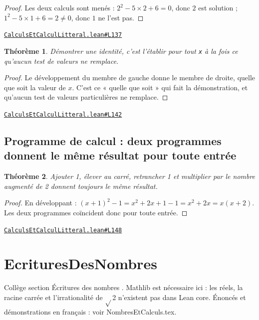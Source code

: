 \documentclass[11pt,a4paper]{article}
\theoremstyle{definition}
\theoremstyle{plain}
\newtheorem{theoreme}{Théorème}
\newcommand{\source}[2]{\par\smallskip\noindent\hfill{\footnotesize\href{#1}{\texttt{#2}}}\par\smallskip}
\begin{document}
\begin{proof}
Les deux calculs sont menés : $2^2 - 5 \times 2 + 6 = 0$, donc $2$ est solution ;
$1^2 - 5 \times 1 + 6 = 2 \ne 0$, donc $1$ ne l'est pas.
\end{proof}
\source{https://github.com/Commutator-IO/learn-lean/blob/main/cours/01-college/01-nombres-et-calculs/CalculsEtCalculLitteral.lean\#L137}{CalculsEtCalculLitteral.lean\#L137}

\begin{theoreme}
Démontrer une identité, c'est l'établir pour tout \texttt{x} à la fois \textemdash{} ce qu'aucun test de
valeurs ne remplace.
\end{theoreme}

\begin{proof}
Le développement du membre de gauche donne le membre de droite, quelle que soit la
valeur de $x$. C'est ce « quelle que soit » qui fait la démonstration, et qu'aucun test de
valeurs particulières ne remplace.
\end{proof}
\source{https://github.com/Commutator-IO/learn-lean/blob/main/cours/01-college/01-nombres-et-calculs/CalculsEtCalculLitteral.lean\#L142}{CalculsEtCalculLitteral.lean\#L142}

\subsection{Programme de calcul : deux programmes donnent le même résultat pour toute entrée}

\begin{theoreme}
\og{} Ajouter 1, élever au carré, retrancher 1 \fg{} et \og{} multiplier par le nombre augmenté
de 2 \fg{} donnent toujours le même résultat.
\end{theoreme}

\begin{proof}
En développant : $(x+1)^2 - 1 = x^2 + 2x + 1 - 1 = x^2 + 2x = x(x+2)$. Les deux
programmes coïncident donc pour toute entrée.
\end{proof}
\source{https://github.com/Commutator-IO/learn-lean/blob/main/cours/01-college/01-nombres-et-calculs/CalculsEtCalculLitteral.lean\#L148}{CalculsEtCalculLitteral.lean\#L148}

\section{EcrituresDesNombres}

\noindent
Collège \textemdash{} section \og{} Écritures des nombres \fg{}. Mathlib est nécessaire ici : les réels,
la racine carrée et l'irrationalité de \(\sqrt{}\)2 n'existent pas dans Lean core.
Énoncés et démonstrations en français : voir NombresEtCalculs.tex.
\end{document}
